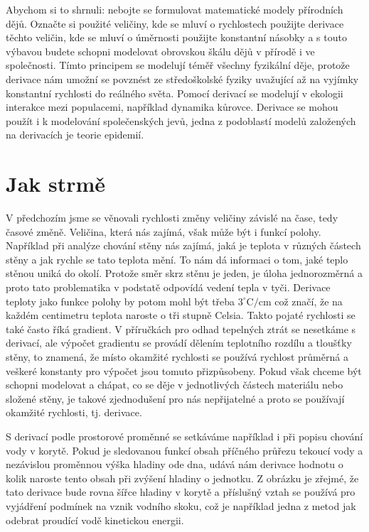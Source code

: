 \documentclass[12pt]{article}
\begin{document}
Abychom si to shrnuli: nebojte se formulovat matematické modely přírodních dějů. Označte si použité veličiny, kde se mluví o rychlostech použijte derivace těchto veličin, kde se mluví o úměrnosti použijte konstantní násobky a s touto výbavou budete schopni modelovat obrovskou škálu dějů v přírodě i ve společnosti. Tímto principem se modelují téměř všechny fyzikální děje, protože derivace nám umožní se povznést ze středoškolské fyziky uvažující až na vyjímky konstantní rychlosti do reálného světa. Pomocí derivací se modelují v ekologii interakce mezi populacemi, například dynamika kůrovce. Derivace se mohou použít i k modelování společenských jevů, jedna z podoblastí modelů založených na derivacích je teorie epidemií.

\newpage
\section*{Jak strmě}

V předchozím jsme se věnovali rychlosti změny veličiny závislé na čase, tedy časové změně. Veličina, která nás zajímá, však může být i funkcí polohy. Například při analýze chování stěny nás zajímá, jaká je teplota v různých částech stěny a jak rychle se tato teplota mění. To nám dá informaci o tom, jaké teplo stěnou uniká do okolí. Protože směr skrz stěnu je jeden, je úloha jednorozměrná a proto tato problematika v podstatě odpovídá vedení tepla v tyči. Derivace teploty jako funkce polohy by potom mohl být třeba $3 ^\circ\mathrm{C}/\mathrm{cm}$ což značí, že na každém centimetru teplota naroste o tři stupně Celsia. Takto pojaté rychlosti se také často říká gradient. V příručkách pro odhad tepelných ztrát se nesetkáme s derivací, ale výpočet gradientu se provádí dělením teplotního rozdílu a tloušťky stěny, to znamená, že místo okamžité rychlosti se používá rychlost průměrná a veškeré konstanty pro výpočet jsou tomuto přizpůsobeny. Pokud však chceme být schopni modelovat a chápat, co se děje v jednotlivých částech materiálu nebo složené stěny, je takové zjednodušení pro nás nepřijatelné a proto se používají okamžité rychlosti, tj. derivace.

S derivací podle prostorové proměnné se setkáváme například i při popisu chování vody v korytě. Pokud je sledovanou funkcí obsah příčného průřezu tekoucí vody a nezávislou proměnnou výška hladiny ode dna, udává nám derivace hodnotu o kolik naroste tento obsah při zvýšení hladiny o jednotku. Z obrázku je zřejmé, že tato derivace bude rovna šířce hladiny v korytě a příslušný vztah se používá pro vyjádření podmínek na vznik vodního skoku, což je například jedna z metod jak odebrat proudící vodě kinetickou energii.
\end{document}

